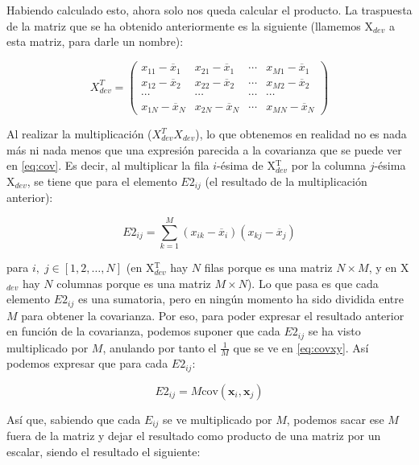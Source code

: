 \documentclass[11pt,a4paper]{article}
\newcommand{\cov}{\text{cov}}
\begin{document}
Habiendo calculado esto, ahora solo nos queda calcular el producto. La traspuesta de la matriz que se ha obtenido
anteriormente es la siguiente (llamemos X$_{dev}$ a esta matriz, para darle un nombre):

\begin{equation}
\label{eq:x1t}
X_{dev}^T = 
\left(
{
\begin{array}{cccc}
	x_{11} - \overline{x}_{1} & x_{21} - \overline{x}_{1} & \cdots & x_{M1} - \overline{x}_{1} \\
	x_{12} - \overline{x}_{2} & x_{22} - \overline{x}_{2} & \cdots & x_{M2} - \overline{x}_{2} \\
	\cdots & \cdots & \cdots & \cdots \\
	x_{1N} - \overline{x}_{N} & x_{2N} - \overline{x}_{N} & \cdots & x_{MN} - \overline{x}_{N}
\end{array}
}
\right)
\end{equation}

Al realizar la multiplicación ($X_{dev}^TX_{dev}$), lo que obtenemos en realidad no es nada más ni nada menos que una
expresión parecida a la covarianza que se puede ver en \eqref{eq:cov}. Es decir, al multiplicar la fila $i$-ésima de 
X$_{dev}^\text{T}$ por la columna $j$-ésima X$_{dev}$, se tiene que para el elemento $E2_{ij}$ (el resultado de la
multiplicación anterior):

\begin{equation}
	E2_{ij} = \sum_{k=1}^M (x_{ik} - \overline{x}_i)(x_{kj} - \overline{x}_j)
\end{equation}

\noindent para $i, \; j \in [1, 2, \dots, N]$ (en X$_{dev}^\text{T}$ hay $N$ filas porque es una matriz $N \times M$, y en
X$_{dev}$ hay $N$ columnas porque es una matriz $M \times N$). Lo que pasa es que cada elemento $E2_{ij}$ es una sumatoria,
pero en ningún momento ha sido dividida entre $M$ para obtener la covarianza. Por eso, para poder expresar el resultado
anterior en función de la covarianza, podemos suponer que cada $E2_{ij}$ se ha visto multiplicado por $M$, anulando por tanto
el $\frac{1}{M}$ que se ve en \eqref{eq:covxy}. Así podemos expresar que para cada $E2_{ij}$:

\begin{equation}
	E2_{ij} = M \cov(\mathbf{x}_i,\mathbf{x}_j)
\end{equation}

Así que, sabiendo que cada $E_{ij}$ se ve multiplicado por $M$, podemos sacar ese $M$ fuera de la matriz y dejar el resultado
como producto de una matriz por un escalar, siendo el resultado el siguiente:
\end{document}
